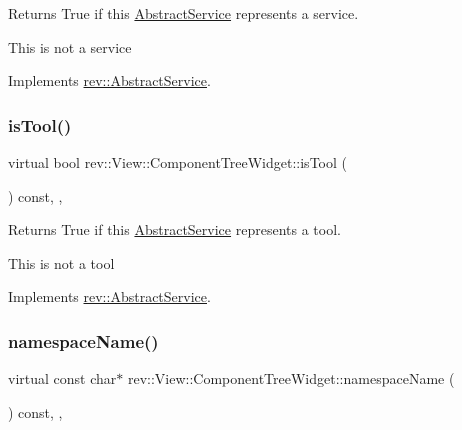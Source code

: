 Returns True if this \mbox{\hyperlink{classrev_1_1_abstract_service}{Abstract\+Service}} represents a service. 

This is not a service 

Implements \mbox{\hyperlink{classrev_1_1_abstract_service_a2ee1ad1b9d10a1d702d0a484e214b99d}{rev\+::\+Abstract\+Service}}.

\mbox{\label{classrev_1_1_view_1_1_component_tree_widget_a9f0f92a353582f6efe343ea4e5d1e9b8}} 
\subsubsection{\texorpdfstring{isTool()}{isTool()}}
{\footnotesize\ttfamily virtual bool rev\+::\+View\+::\+Component\+Tree\+Widget\+::is\+Tool (\begin{DoxyParamCaption}{ }\end{DoxyParamCaption}) const\hspace{0.3cm}{\ttfamily [inline]}, {\ttfamily [override]}, {\ttfamily [virtual]}}



Returns True if this \mbox{\hyperlink{classrev_1_1_abstract_service}{Abstract\+Service}} represents a tool. 

This is not a tool 

Implements \mbox{\hyperlink{classrev_1_1_abstract_service_aeb245a6d33601ccb842f4c7c2a3dda7a}{rev\+::\+Abstract\+Service}}.

\mbox{\label{classrev_1_1_view_1_1_component_tree_widget_aabf1838a1bf9240def872d8526b3aa4b}} 
\subsubsection{\texorpdfstring{namespaceName()}{namespaceName()}}
{\footnotesize\ttfamily virtual const char$\ast$ rev\+::\+View\+::\+Component\+Tree\+Widget\+::namespace\+Name (\begin{DoxyParamCaption}{ }\end{DoxyParamCaption}) const\hspace{0.3cm}{\ttfamily [inline]}, {\ttfamily [override]}, {\ttfamily [virtual]}}



